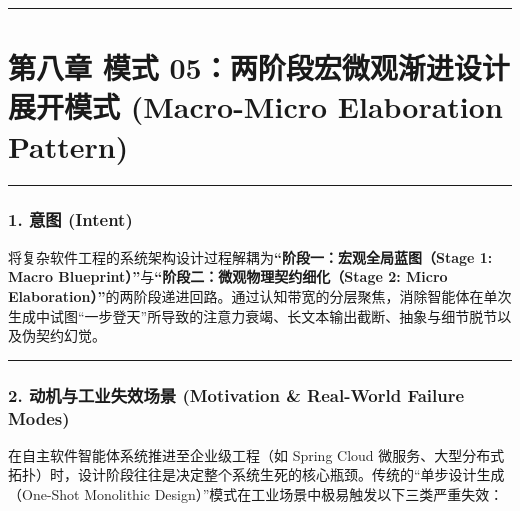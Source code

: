 \documentclass[
]{ctexart}
\renewcommand{\_}{\discretionary{}{}{\textunderscore}}
\let\oldsection\section
\renewcommand{\section}{\clearpage\oldsection}
\begin{document}
\begin{center}\rule{0.5\linewidth}{0.5pt}\end{center}

\section{第八章 模式 05：两阶段宏微观渐进设计展开模式 (Macro-Micro Elaboration
Pattern)}\label{ux6a21ux5f0f-05ux4e24ux9636ux6bb5ux5b8fux5faeux89c2ux6e10ux8fdbux8bbeux8ba1ux5c55ux5f00ux6a21ux5f0f-macro-micro-elaboration-pattern}

\begin{center}\rule{0.5\linewidth}{0.5pt}\end{center}

\subsubsection{1. 意图 (Intent)}\label{ux610fux56fe-intent-4}

将复杂软件工程的系统架构设计过程解耦为\textbf{``阶段一：宏观全局蓝图（Stage
1: Macro Blueprint）''}与\textbf{``阶段二：微观物理契约细化（Stage 2:
Micro
Elaboration）''}的两阶段递进回路。通过认知带宽的分层聚焦，消除智能体在单次生成中试图``一步登天''所导致的注意力衰竭、长文本输出截断、抽象与细节脱节以及伪契约幻觉。

\begin{center}\rule{0.5\linewidth}{0.5pt}\end{center}

\subsubsection{2. 动机与工业失效场景 (Motivation \& Real-World Failure
Modes)}\label{ux52a8ux673aux4e0eux5de5ux4e1aux5931ux6548ux573aux666f-motivation-real-world-failure-modes-4}

在自主软件智能体系统推进至企业级工程（如 Spring Cloud
微服务、大型分布式拓扑）时，设计阶段往往是决定整个系统生死的核心瓶颈。传统的``单步设计生成（One-Shot
Monolithic Design）''模式在工业场景中极易触发以下三类严重失效：
\end{document}
